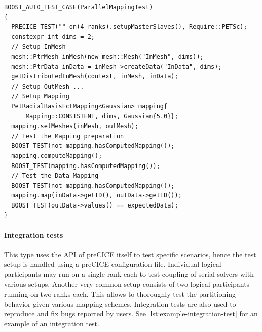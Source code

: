\begin{listing}[h!]
  \centering
\begin{minipage}{0.85\linewidth}
\begin{verbatim}
BOOST_AUTO_TEST_CASE(ParallelMappingTest)
{
  PRECICE_TEST(""_on(4_ranks).setupMasterSlaves(), Require::PETSc);
  constexpr int dims = 2;
  // Setup InMesh
  mesh::PtrMesh inMesh(new mesh::Mesh("InMesh", dims));
  mesh::PtrData inData = inMesh->createData("InData", dims);
  getDistributedInMesh(context, inMesh, inData);
  // Setup OutMesh ...
  // Setup Mapping
  PetRadialBasisFctMapping<Gaussian> mapping{
      Mapping::CONSISTENT, dims, Gaussian{5.0}};
  mapping.setMeshes(inMesh, outMesh);
  // Test the Mapping preparation
  BOOST_TEST(not mapping.hasComputedMapping());
  mapping.computeMapping();
  BOOST_TEST(mapping.hasComputedMapping());
  // Test the Data Mapping
  BOOST_TEST(not mapping.hasComputedMapping());
  mapping.map(inData->getID(), outData->getID());
  BOOST_TEST(outData->values() == expectedData);
}
\end{verbatim}
\end{minipage}
\caption{Example unit test of a parallel RBF mapping running on 4 ranks.
Further requirements on the test are the setup of the master-slave communication and the initialization of PETSc.
First the test defines meshes and associated data followed by setting up and executing the mapping.
The result is the checked against the expected outcome.
The example showcases the preparation involved in testing individual components of preCICE in a parallel context.
}
\label{lst:example-unit-test}
\end{listing}

\paragraph{Integration tests} This type uses the API of preCICE itself to test specific scenarios, hence the test setup is handled using a preCICE configuration file.
Individual logical participants may run on a single rank each to test
coupling of serial solvers with various setups.
Another very common setup consists of two logical participants running on two ranks each.
This allows to thoroughly test the partitioning behavior given various mapping schemes.
Integration tests are also used to reproduce and fix bugs reported by users.
See \autoref{lst:example-integration-test} for an example of an integration test.

